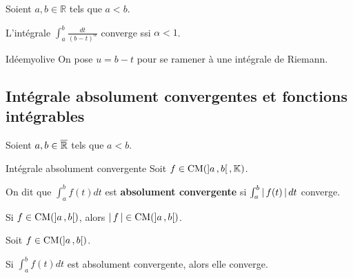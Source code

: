     \begin{prop}{}{}
        Soient $a,b \in \mathbb{R}$ tels que $a < b$. 

        L’intégrale $\int_{a}^{b} \frac{dt}{(b-t)^{\alpha}}$ converge ssi $\alpha < 1$.
    \end{prop}

    \begin{demo}{Idée}{myolive}
        On pose $u = b-t$ pour se ramener à une intégrale de Riemann.
    \end{demo}

\subsection{Intégrale absolument convergentes et fonctions intégrables}

    Soient $a,b \in \overline{\mathbb{R}}$ tels que $a < b$.

    \begin{defi}{Intégrale absolument convergente}{}
        Soit $f \in \operatorname{CM}(\left] a \, , b \right[,\mathbb{K})$. 

        On dit que $\int_{a}^{b} f(t)dt$ est \textbf{absolument convergente} si $\int_{a}^{b} \left\lvert \,f(t) \, \right\rvert dt$ converge.
    \end{defi}

    \begin{prop}{}{}
        Si $f \in \operatorname{CM}(\left] a \, , b \right[)$, alors $\left\lvert \,f \, \right\rvert \in \operatorname{CM}(\left] a \, , b \right[)$.
    \end{prop}

    \begin{prop}{}{}
        Soit $f \in \operatorname{CM}(\left] a \, , b \right[)$.

        Si $\int_{a}^{b} f(t)dt$ est absolument convergente, alors elle converge.
    \end{prop}

